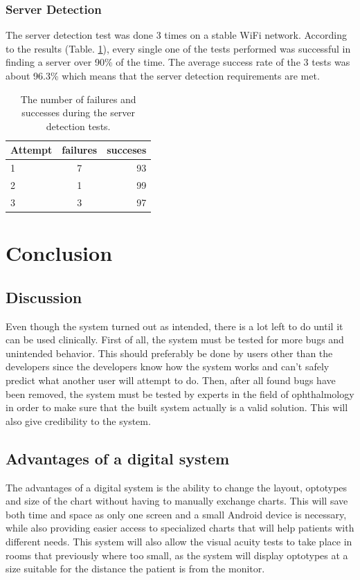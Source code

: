\documentclass[12pt,a4paper,notitlepage]{report}
\begin{document}
\subsection{Server Detection}
The server detection test was done 3 times on a stable WiFi network. According to the results (Table. \ref{tab:server_detection_test}), every single one of the tests performed was successful in finding a server over 90\% of the time. The average success rate of the 3 tests was about 96.3\% which means that the server detection requirements are met.

\begin{table}[ht!]
\centering
\begin{tabular}{l c r}
Attempt	&	failures	&	succeses	\\
\hline
1	&	7	&	93	\\
2	&	1	&	99	\\
3	&	3	&	97	\\
\end{tabular}
\caption{The number of failures and successes during the server detection tests. \label{tab:server_detection_test}}
\end{table}


\chapter{ Conclusion}

\section{Discussion}
Even though the system turned out as intended, there is a lot left to do until it can be used clinically. First of all, the system must be tested for more bugs and unintended behavior. This should preferably be done by users other than the developers since the developers know how the system works and can't safely predict what another user will attempt to do. Then, after all found bugs have been removed, the system must be tested by experts in the field of ophthalmology in order to make sure that the built system actually is a valid solution. This will also give credibility to the system.

\section{Advantages of a digital system}
The advantages of a digital system is the ability to change the layout, optotypes and size of the chart without having to manually exchange charts. This will save both time and space as only one screen and a small Android device is necessary, while also providing easier access to specialized charts that will help patients with different needs. This system will also allow the visual acuity tests to take place in rooms that previously where too small, as the system will display optotypes at a size suitable for the distance the patient is from the monitor.
\end{document}
